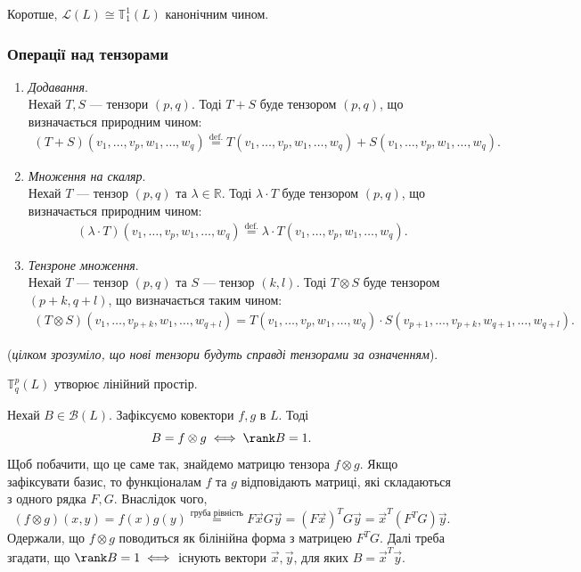 \documentclass{math_library}
\begin{document}
\begin{remark}
Коротше, $\mathcal{L}(L) \cong \mathbb{T}_1^1(L)$ канонічним чином.
\end{remark}

\subsubsection*{Операції над тензорами}
\begin{enumerate}[nosep,wide=0pt,label={\arabic*.}]
\item \textit{Додавання}.\\
Нехай $T,S$ --- тензори $(p,q)$. Тоді $T+S$ буде тензором $(p,q)$, що визначається природним чином:
\begin{align*}
(T+S)(v_1,\dots,v_p,w_1,\dots,w_q) \overset{\text{def.}}{=} T(v_1,\dots,v_p,w_1,\dots,w_q) + S(v_1,\dots,v_p,w_1,\dots,w_q).
\end{align*}
\item \textit{Множення на скаляр}.\\
Нехай $T$ --- тензор $(p,q)$ та $\lambda \in \mathbb{R}$. Тоді $\lambda \cdot T$ буде тензором $(p,q)$, що визначається природним чином:
\begin{align*}
(\lambda \cdot T)(v_1,\dots,v_p,w_1,\dots,w_q) \overset{\text{def.}}{=} \lambda \cdot T(v_1,\dots,v_p,w_1,\dots,w_q).
\end{align*}
\item \textit{Тензроне множення}.\\
Нехай $T$ --- тензор $(p,q)$ та $S$ --- тензор $(k,l)$. Тоді $T \otimes S$ буде тензором $(p+k,q+l)$, що визначається таким чином:
\begin{align*}
(T \otimes S)(v_1,\dots,v_{p+k},w_1,\dots,w_{q+l}) = T(v_1,\dots,v_p,w_1,\dots,w_q) \cdot S(v_{p+1},\dots,v_{p+k},w_{q+1},\dots,w_{q+l}).
\end{align*}
\end{enumerate}
\noindent
(\textit{цілком зрозуміло, що нові тензори будуть справді тензорами за означенням}).

\begin{remark}
$\mathbb{T}_q^p(L)$ утворює лінійний простір.
\end{remark}

\begin{example}
Нехай $B \in \mathcal{B}(L)$. Зафіксуємо ковектори $f,g$ в $L$. Тоді
\[
B = f \otimes g \iff \rank B = 1.
\]
Щоб побачити, що це саме так, знайдемо матрицю тензора $f \otimes g$. Якщо зафіксувати базис, то функціоналам $f$ та $g$ відповідають матриці, які складаються з одного рядка $F,G$. Внаслідок чого,
\[
(f \otimes g)(x,y) = f(x) g(y) \overset{\text{груба рівність}}{=} F \vec{x} G \vec{y} = (F \vec{x})^T G \vec{y} = \vec{x}^T (F^T G) \vec{y}.
\]
Одержали, що $f \otimes g$ поводиться як білінійна форма з матрицею $F^T G$. Далі треба згадати, що $\rank B = 1 \iff$ існують вектори $\vec{x},\vec{y}$, для яких $B = \vec{x}^T \vec{y}$.
\end{example}
\end{document}
